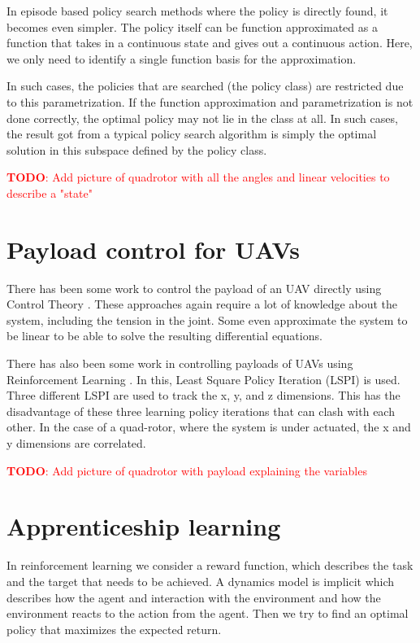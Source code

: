 \documentclass[BTech]{iitmdiss}
\newcommand\todo[1]{\textcolor{red}{{\bf TODO}: #1}}
\begin{document}
In episode based policy search methods where the policy is directly found, it becomes even simpler. The policy itself can be function approximated as a function that takes in a continuous state and gives out a continuous action. Here, we only need to identify a single function basis for the approximation.

In such cases, the policies that are searched (the policy class) are restricted due to this parametrization. If the function approximation and parametrization is not done correctly, the optimal policy may not lie in the class at all. In such cases, the result got from a typical policy search algorithm is simply the optimal solution in this subspace defined by the policy class.

\todo{Add picture of quadrotor with all the angles and linear velocities to describe a "state"}

\section{Payload control for UAVs}

There has been some work to control the payload of an UAV directly using Control Theory \cite{PayloadControlTheory,PayloadControlTheory2}. These approaches again require a lot of knowledge about the system, including the tension in the joint. Some even approximate the system to be linear to be able to solve the resulting differential equations.

There has also been some work in controlling payloads of UAVs using Reinforcement Learning \cite{PayloadLSPI}. In this, Least Square Policy Iteration (LSPI) is used. Three different LSPI are used to track the x, y, and z dimensions. This has the disadvantage of these three learning policy iterations that can clash with each other. In the case of a quad-rotor, where the system is under actuated, the x and y dimensions are correlated.

\todo{Add picture of quadrotor with payload explaining the variables}

\section{Apprenticeship learning}

In reinforcement learning we consider a reward function, which describes the task and the target that needs to be achieved. A dynamics model is implicit which describes how the agent and interaction with the environment and how the environment reacts to the action from the agent. Then we try to find an optimal policy that maximizes the expected return.
\end{document}
